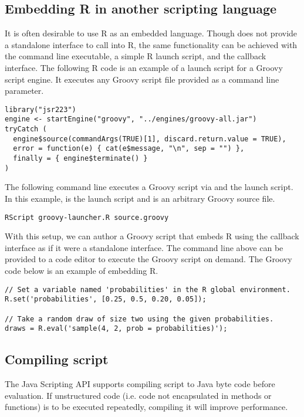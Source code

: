 \subsection{Embedding R in another scripting language}

It is often desirable to use R as an embedded language. Though  does not provide a standalone interface to call into R, the same functionality can be achieved with the  command line executable, a simple R launch script, and the  callback interface. The following R code is an example of a launch script for a Groovy script engine. It executes any Groovy script file provided as a command line parameter.

\begin{verbatim}
library("jsr223")
engine <- startEngine("groovy", "../engines/groovy-all.jar")
tryCatch (
  engine$source(commandArgs(TRUE)[1], discard.return.value = TRUE),
  error = function(e) { cat(e$message, "\n", sep = "") },
  finally = { engine$terminate() }
)
\end{verbatim}

The following command line executes a Groovy script via  and the launch script. In this example,  is the launch script and  is an arbitrary Groovy source file.

\begin{verbatim}
RScript groovy-launcher.R source.groovy
\end{verbatim}

With this setup, we can author a Groovy script that embeds R using the  callback interface as if it were a standalone interface. The command line above can be provided to a code editor to execute the Groovy script on demand. The Groovy code below is an example of embedding R.

\begin{verbatim}
// Set a variable named 'probabilities' in the R global environment.
R.set('probabilities', [0.25, 0.5, 0.20, 0.05]);

// Take a random draw of size two using the given probabilities.
draws = R.eval('sample(4, 2, prob = probabilities)');
\end{verbatim}

\subsection{Compiling script}

The Java Scripting API supports compiling script to Java byte code before evaluation. If unstructured code (i.e. code not encapsulated in methods or functions) is to be executed repeatedly, compiling it will improve performance.

